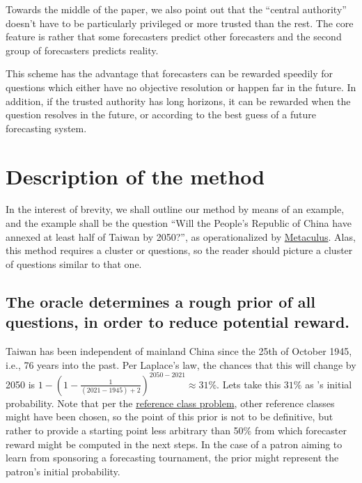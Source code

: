 \documentclass[]{article}
\begin{document}
Towards the middle of the paper, we also point out that the ``central
authority'' doesn't have to be particularly privileged or more trusted
than the rest. The core feature is rather that some forecasters predict
other forecasters and the second group of forecasters predicts reality.

This scheme has the advantage that forecasters can be rewarded speedily
for questions which either have no objective resolution or happen far in
the future. In addition, if the trusted authority has long horizons, it
can be rewarded when the question resolves in the future, or according
to the best guess of a future forecasting system.

\hypertarget{description-of-the-method}{%
\section{Description of the method}\label{description-of-the-method}}

In the interest of brevity, we shall outline our method by means of an
example, and the example shall be the question ``Will the People's
Republic of China have annexed at least half of Taiwan by 2050?'', as
operationalized by
\href{https://www.metaculus.com/questions/5320/chinese-annexation-of-most-of-taiwan-by-2050/}{Metaculus}.
Alas, this method requires a cluster or questions, so the reader should
picture a cluster of questions similar to that one.

\hypertarget{the-oracle-determines-a-rough-prior-of-all-questions-in-order-to-reduce-potential-reward.}{%
\subsection{The oracle determines a rough prior of all questions, in
order to reduce potential
reward.}\label{the-oracle-determines-a-rough-prior-of-all-questions-in-order-to-reduce-potential-reward.}}

Taiwan has been independent of mainland China since the 25th of October
1945, i.e., 76 years into the past. Per Laplace's law, the chances that
this will change by 2050 is
\(1-(1-\frac{1}{(2021-1945)+2})^{2050-2021} \approx 31\%\). Lets take
this \(31\%\) as 's initial probability. Note that per the
\href{https://en.wikipedia.org/wiki/Reference_class_problem}{reference
class problem}, other reference classes might have been chosen, so the
point of this prior is not to be definitive, but rather to provide a
starting point less arbitrary than 50\% from which forecaster reward
might be computed in the next steps. In the case of a patron aiming to
learn from sponsoring a forecasting tournament, the prior might
represent the patron's initial probability.
\end{document}
